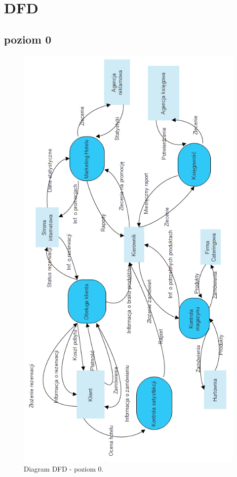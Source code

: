 \documentclass[a4paper, 11pt]{article}
\begin{document}
	\vfill		
	\section{DFD}
	\indent
	\subsection{poziom 0}
	\indent
	\begin{figure}[H]%
			\center
			\includegraphics[scale=0.7]{Img/DFDpoziom0.png}\caption{Diagram DFD - poziom 0.}
	\end{figure}
\end{document}
